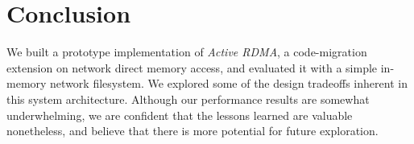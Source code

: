 \documentclass[10pt]{article}
\begin{document}
\section{Conclusion}

We built a prototype implementation of \emph{Active RDMA}, a
code-migration extension on network direct memory access, and
evaluated it with a simple in-memory network filesystem. We explored
some of the design tradeoffs inherent in this system
architecture. Although our performance results are somewhat
underwhelming, we are confident that the lessons learned are valuable
nonetheless, and believe that there is more potential for future
exploration.

 
\end{document}
